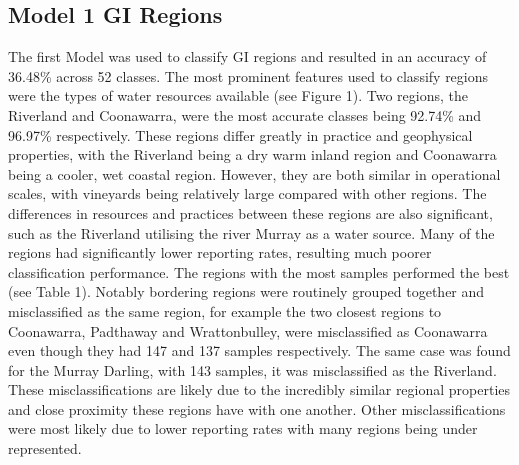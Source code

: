 \documentclass[review,12pt,authoryear]{elsarticle}
\begin{document}
\begin{linenumbers}
\subsection{Model 1 GI Regions}
The first Model was used to classify GI regions %
and resulted in an accuracy of 36.48\% across 52 classes. The most prominent features used to classify regions were the types of water resources available (see Figure 1). Two regions, the Riverland and Coonawarra, were the most accurate classes being 92.74\% and 96.97\% respectively.
These regions differ greatly in practice and geophysical properties, with the Riverland being a dry warm inland region and Coonawarra being a cooler, wet coastal region. However, they are both similar in operational scales, with vineyards being relatively large compared with other regions.
%
%
The differences in resources and practices between these regions are also significant, such as the Riverland utilising the river Murray as a water source.
Many of the regions had significantly lower reporting rates, resulting much poorer classification performance. %
 The regions with the most samples performed the best (see Table 1). Notably bordering regions were routinely grouped together and misclassified as the same region, for example the two closest regions to Coonawarra, Padthaway and Wrattonbulley, were misclassified as Coonawarra even though they had 147 and 137 samples respectively. The same case was found for the Murray Darling, with 143 samples, it was misclassified as the Riverland.
These misclassifications are likely due to the incredibly similar regional properties and close proximity these regions have with one another. Other misclassifications were most likely due to lower reporting rates with many regions being under represented.


\end{linenumbers}
\end{document}
